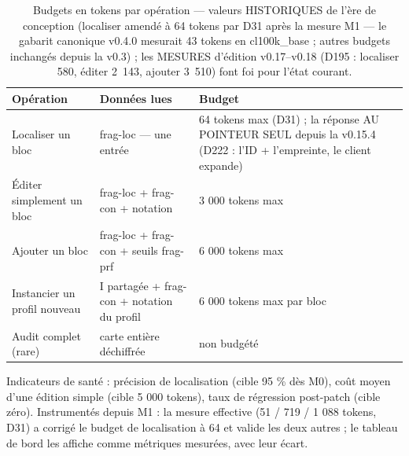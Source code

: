 \begin{table}[htbp]
\centering\small
\caption{Budgets en tokens par opération — valeurs HISTORIQUES de l'ère de conception (localiser amendé à 64 tokens par D31 après la mesure M1 — le gabarit canonique v0.4.0 mesurait 43 tokens en cl100k\_base ; autres budgets inchangés depuis la v0.3) ; les MESURES d'édition v0.17--v0.18 (D195 : localiser 580, éditer 2~143, ajouter 3~510) font foi pour l'état courant.}
\label{tab:budgets}
\begin{tabularx}{\textwidth}{@{}Y Y l@{}}
\toprule
\textbf{Opération} & \textbf{Données lues} & \textbf{Budget} \\
\midrule
Localiser un bloc & frag-loc — une entrée & 64 tokens max (D31) ; la réponse AU POINTEUR SEUL depuis la v0.15.4 (D222 : l'ID + l'empreinte, le client expande) \\
Éditer simplement un bloc & frag-loc + frag-con + notation & 3 000 tokens max \\
Ajouter un bloc & frag-loc + frag-con + seuils frag-prf & 6 000 tokens max \\
Instancier un profil nouveau & I partagée + frag-con + notation du profil & 6 000 tokens
max par bloc \\
Audit complet (rare) & carte entière déchiffrée & non budgété \\
\bottomrule
\end{tabularx}
\end{table}

Indicateurs de santé : précision de localisation (cible 95 \% dès M0), coût moyen d’une
édition simple (cible 5 000 tokens), taux de régression post-patch (cible zéro).
Instrumentés depuis M1 : la mesure effective (51 / 719 / 1 088 tokens, D31) a corrigé
le budget de localisation à 64 et valide les deux autres ; le tableau de bord les
affiche comme métriques mesurées, avec leur écart.
